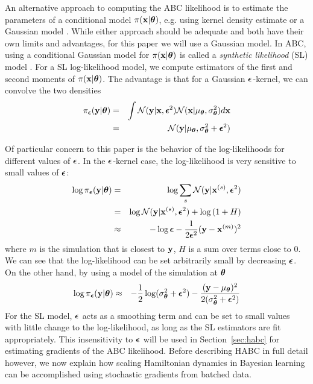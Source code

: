 \documentclass[]{article}
\begin{document}
An alternative approach to computing the ABC likelihood is to estimate the parameters of a conditional model  $\pi({\bf x}|{\bm \theta})$, e.g. using kernel density estimate \cite{TurnerGenLik2014} or a Gaussian model \cite{wood2010statistical}.  While either approach should be adequate and both have their own limits and advantages, for this paper we will use a Gaussian model.  In ABC, using a conditional Gaussian model for  $\pi({\bf x}|{\bm \theta})$ is called a {\em synthetic likelihood} (SL) model \cite{wood2010statistical}.  For a SL log-likelihood model, we compute estimators of the first and second moments of $\pi({\bf x}|{\bm \theta})$.  The advantage is that for a Gaussian ${\bm {\epsilon}}$-kernel, we can convolve the two densities   
\begin{eqnarray}
  \pi_{{\bm {\epsilon}}}( {\bf y} | {\bm \theta} ) & = & \int \mathcal{N}( {\bf y} | {\bf x}, {\bm {\epsilon}}^2 ) \mathcal{N}( {\bf x} | 
  \mu_{{\bm \theta}}, \sigma^2_{{\bm \theta}} ) d{\bf x} \\
                          & = & \mathcal{N}( {\bf y} | \mu_{{\bm \theta}}, \sigma^2_{{\bm \theta}} + {\bm {\epsilon}}^2 )
\end{eqnarray}

Of particular concern to this paper is the behavior of the log-likelihoods for different values of ${\bm {\epsilon}}$.  In the ${\bm {\epsilon}}$-kernel case, the log-likelihood is very sensitive to small values of ${\bm {\epsilon}}$:
\begin{eqnarray}
  \log \pi_{{\bm {\epsilon}}}( {\bf y} | {\bm \theta} ) & = & \log \sum_s \mathcal{N}( {\bf y} | {\bf x}^{(s)}, {\bm {\epsilon}}^2 ) \\
                          & = & \log \mathcal{N}( {\bf y} | {\bf x}^{(s)}, {\bm {\epsilon}}^2 ) + \log\left( 1 + H \right) \\
                          & \approx & -\log {\bm {\epsilon}} -\frac{1}{2 {\bm {\epsilon}}^2} ( {\bf y} - {\bf x}^{(m)} )^2 
\end{eqnarray}
where $m$ is the simulation that is closest to ${\bf y}$, $H$ is a sum over terms close to $0$. We can see that the log-likelihood can be set arbitrarily small by decreasing ${\bm {\epsilon}}$.  On the other hand, by using a model of the simulation at ${\bm \theta}$
\begin{eqnarray}
 \log \pi_{{\bm {\epsilon}}}( {\bf y} | {\bm \theta} ) & \approx & -\frac{1}{2} \log (\sigma^2_{{\bm \theta}} + {\bm {\epsilon}}^2 ) -\frac{( {\bf y} - \mu_{{\bm \theta}} )^2 }{2 (\sigma^2_{{\bm \theta}} + {\bm {\epsilon}}^2 )} 
\end{eqnarray}
 For the SL model, ${\bm {\epsilon}}$ acts as a smoothing term and can be set to small values with little change to the log-likelihood, as long as the SL estimators are fit appropriately.  This insensitivity to ${\bm {\epsilon}}$ will be used in Section~\ref{sec:habc} for estimating gradients of the ABC likelihood. Before describing HABC in full detail however, we now explain how scaling Hamiltonian dynamics in Bayesian learning can be accomplished using stochastic gradients from batched data.
 
\end{document}
